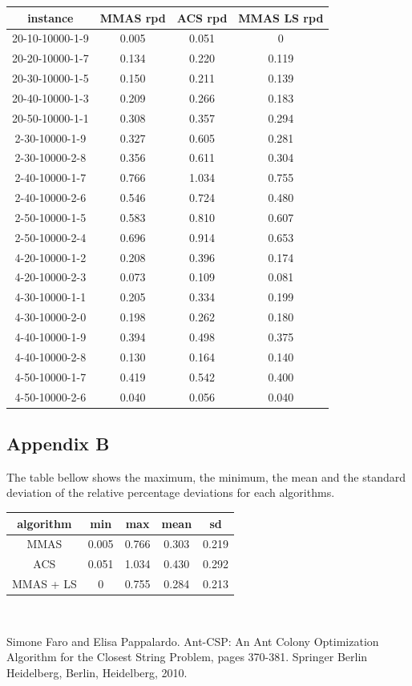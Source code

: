 \documentclass{article}
\begin{document}
\begin{tabular}{c|c|c|c}
instance & MMAS rpd & ACS rpd & MMAS LS rpd \\
\hline
20-10-10000-1-9 & 0.005 & 0.051 & 0 \\
20-20-10000-1-7 & 0.134 & 0.220 & 0.119 \\
20-30-10000-1-5 & 0.150 & 0.211 & 0.139 \\
20-40-10000-1-3 & 0.209 & 0.266 & 0.183 \\
20-50-10000-1-1 & 0.308 & 0.357 & 0.294 \\
2-30-10000-1-9 & 0.327 & 0.605 & 0.281 \\
2-30-10000-2-8 & 0.356 & 0.611 & 0.304 \\
2-40-10000-1-7 & 0.766 & 1.034 & 0.755 \\
2-40-10000-2-6 & 0.546 & 0.724 & 0.480 \\
2-50-10000-1-5 & 0.583 & 0.810 & 0.607 \\
2-50-10000-2-4 & 0.696 & 0.914 & 0.653 \\
4-20-10000-1-2 & 0.208 & 0.396 & 0.174 \\
4-20-10000-2-3 & 0.073 & 0.109 & 0.081 \\
4-30-10000-1-1 & 0.205 & 0.334 & 0.199 \\
4-30-10000-2-0 & 0.198 & 0.262 & 0.180 \\
4-40-10000-1-9 & 0.394 & 0.498 & 0.375 \\
4-40-10000-2-8 & 0.130 & 0.164 & 0.140 \\
4-50-10000-1-7 & 0.419 & 0.542 & 0.400 \\
4-50-10000-2-6 & 0.040 & 0.056 & 0.040 \\
\end{tabular}

\subsection{Appendix B}

The table bellow shows the maximum, the minimum, the mean and the standard deviation of the relative percentage deviations for each algorithms.\\

\label{app:rpdsum}

\begin{tabular}{c|c|c|c|c}
    algorithm & min & max & mean & sd \\
    \hline
    MMAS & 0.005 & 0.766 & 0.303 & 0.219 \\
    ACS & 0.051 & 1.034 & 0.430  & 0.292 \\
    MMAS + LS & 0 & 0.755 & 0.284 & 0.213
\end{tabular}\\

\begin{thebibliography}{2}

 Simone Faro and Elisa Pappalardo.
Ant-CSP: An Ant Colony Optimization Algorithm for the Closest String Problem, pages 370-381.
Springer Berlin
Heidelberg, Berlin, Heidelberg, 2010.

\end{thebibliography}
\end{document}
